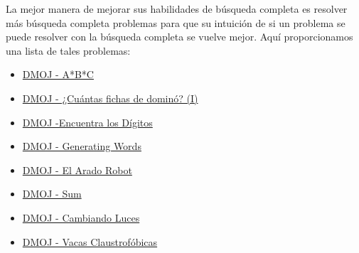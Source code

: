 La mejor manera de mejorar sus habilidades de búsqueda completa es resolver más búsqueda completa
problemas para que su intuición de si un problema se puede resolver con la búsqueda completa se vuelve
mejor. Aquí  proporcionamos una lista de tales problemas:

\begin{itemize}
	\item \href{https://dmoj.uclv.edu.cu/problem/abc}{DMOJ - A*B*C}
	\item \href{https://dmoj.uclv.edu.cu/problem/dominoes1}{DMOJ - ¿Cuántas fichas de dominó? (I)}
	\item \href{https://dmoj.uclv.edu.cu/problem/finddigits}{DMOJ -Encuentra los Dígitos}
	\item \href{https://dmoj.uclv.edu.cu/problem/genword}{DMOJ - Generating Words}
	\item \href{https://dmoj.uclv.edu.cu/problem/rplow}{DMOJ - El Arado Robot}
	\item \href{https://dmoj.uclv.edu.cu/problem/sum}{DMOJ - Sum}
	\item \href{https://dmoj.uclv.edu.cu/problem/swtch}{DMOJ - Cambiando Luces}
	\item \href{https://dmoj.uclv.edu.cu/problem/claust}{DMOJ - Vacas Claustrofóbicas}
\end{itemize}